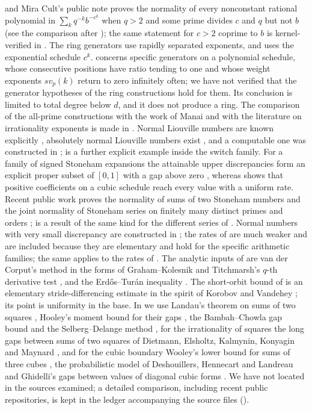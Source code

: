 \documentclass[11pt]{article}
\begin{document}
and Mira Cult's public note \cite[Theorem~1.1]{MiraPoly} proves the normality of every nonconstant
rational polynomial in $\sum_kq^{-k}b^{-c^k}$ when $q>2$ and some prime divides $c$ and $q$ but not $b$
(see the comparison after ); the same statement for $c>2$ coprime to $b$ is
kernel-verified in \cite[Theorem~A]{PaperIv2}. The ring generators use rapidly separated exponents,
and \cite{MiraPoly} uses the exponential schedule $c^k$.  concerns specific generators on a polynomial
schedule, whose consecutive positions have ratio tending to one and whose weight exponents $sv_p(k)$
return to zero infinitely often; we have not verified that the generator hypotheses of the ring
constructions hold for them. Its conclusion is limited to total degree below $d$, and it does not
produce a ring. The comparison of the all-prime constructions with the work of Manai and with the
literature on irrationality exponents is made in \cite{PaperXII}.
Normal Liouville numbers are known explicitly \cite{KS93,BC02}, absolutely normal Liouville numbers
exist \cite{Bugeaud02}, and a computable one was constructed in \cite{BHS15};  is a
further explicit example inside the switch family. For a family of signed Stoneham expansions the
attainable upper discrepancies form an explicit proper subset of $[0,1]$ with a gap above zero
\cite{PaperIII}, whereas  shows that positive coefficients on a cubic schedule reach every
value with a uniform rate. Recent public work proves the normality of sums of two Stoneham numbers \cite{SudeSum} and the
joint normality of Stoneham series on finitely many distinct primes and orders \cite{MiraJoint};
 is a result of the same kind for the different series of . Normal numbers
with very small discrepancy are constructed in \cite{Levin99,ABSS17}; the rates of 
are much weaker and are included because they are elementary and hold for the specific arithmetic
families; the same applies to the rates of . The analytic inputs of 
are van der Corput's method in the forms of Graham--Kolesnik \cite{GK91} and Titchmarsh's $q$-th
derivative test \cite[Theorem~5.13]{Titchmarsh86}, and the Erd\H{o}s--Tur\'an inequality \cite{KN}. The
short-orbit bound of  is an elementary stride-differencing estimate in the
spirit of Korobov \cite{Korobov72} and Vandehey \cite{Vandehey19}; its point is uniformity in the base.
In  we use Landau's theorem on sums of two squares \cite{Landau08}, Hooley's moment
bound for their gaps \cite{Hooley71}, the Bambah--Chowla gap bound \cite{BambahChowla47} and the
Selberg--Delange method \cite{Tenenbaum15}, for the irrationality of squares the long gaps between sums
of two squares of Dietmann, Elsholtz, Kalmynin, Konyagin and Maynard \cite[Theorem~1]{DEKKM}, and for the
cubic boundary Wooley's lower bound for sums of three cubes \cite{Wooley15}, the probabilistic model of
Deshouillers, Hennecart and Landreau \cite{DHL06} and Ghidelli's gaps between values of diagonal cubic
forms \cite[Theorem~1.1]{Ghidelli20}. We have not located  in the sources examined; a detailed
comparison, including recent public repositories, is kept in the ledger accompanying the source files
().
\end{document}
